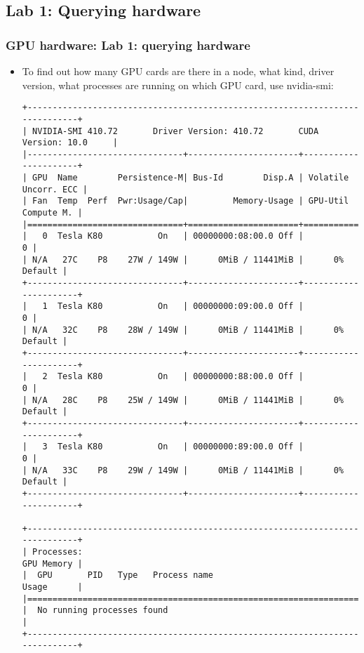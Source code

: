 \subsection{Lab 1: Querying hardware}
\begin{frame}[fragile]
  \frametitle{GPU hardware: Lab 1: querying hardware}
\begin{itemize}
\item To find out how many GPU cards are there in a node, what kind, driver version, what processes are running on which GPU card, use {\color{mycolorcli}nvidia-smi}:
{\tiny
{\color{mycolorcli}
\begin{verbatim}
+-----------------------------------------------------------------------------+
| NVIDIA-SMI 410.72       Driver Version: 410.72       CUDA Version: 10.0     |
|-------------------------------+----------------------+----------------------+
| GPU  Name        Persistence-M| Bus-Id        Disp.A | Volatile Uncorr. ECC |
| Fan  Temp  Perf  Pwr:Usage/Cap|         Memory-Usage | GPU-Util  Compute M. |
|===============================+======================+======================|
|   0  Tesla K80           On   | 00000000:08:00.0 Off |                    0 |
| N/A   27C    P8    27W / 149W |      0MiB / 11441MiB |      0%      Default |
+-------------------------------+----------------------+----------------------+
|   1  Tesla K80           On   | 00000000:09:00.0 Off |                    0 |
| N/A   32C    P8    28W / 149W |      0MiB / 11441MiB |      0%      Default |
+-------------------------------+----------------------+----------------------+
|   2  Tesla K80           On   | 00000000:88:00.0 Off |                    0 |
| N/A   28C    P8    25W / 149W |      0MiB / 11441MiB |      0%      Default |
+-------------------------------+----------------------+----------------------+
|   3  Tesla K80           On   | 00000000:89:00.0 Off |                    0 |
| N/A   33C    P8    29W / 149W |      0MiB / 11441MiB |      0%      Default |
+-------------------------------+----------------------+----------------------+
                                                                               
+-----------------------------------------------------------------------------+
| Processes:                                                       GPU Memory |
|  GPU       PID   Type   Process name                             Usage      |
|=============================================================================|
|  No running processes found                                                 |
+-----------------------------------------------------------------------------+
\end{verbatim}
}
}

\end{itemize}
\end{frame}


